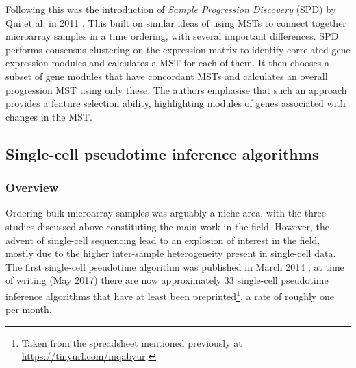 Following this was the introduction of \emph{Sample Progression Discovery} (SPD) by Qui et al. in 2011 \cite{Qiu2011-ol}. This built on similar ideas of using MSTs to connect together microarray samples in a time ordering, with several important differences. SPD performs consensus clustering on the expression matrix to identify correlated gene expression modules and calculates a MST for each of them. It then chooses a subset of gene modules that have concordant MSTs and calculates an overall progression MST using only these. The authors emphasise that such an approach provides a feature selection ability, highlighting modules of genes associated with changes in the MST.



\subsection{Single-cell pseudotime inference algorithms}

\subsubsection{Overview}

Ordering bulk microarray samples was arguably a niche area, with the three studies discussed above constituting the main work in the field. However, the advent of single-cell sequencing lead to an explosion of interest in the field, mostly due to the higher inter-sample heterogeneity present in single-cell data. The first single-cell pseudotime algorithm was published in March 2014 \cite{trapnell2014dynamics}; at time of writing (May 2017) there are now approximately 33 single-cell pseudotime inference algorithms that have at least been preprinted\footnote{
Taken from the spreadsheet mentioned previously at \url{https://tinyurl.com/mqabyur}.
}, a rate of roughly one per month.

